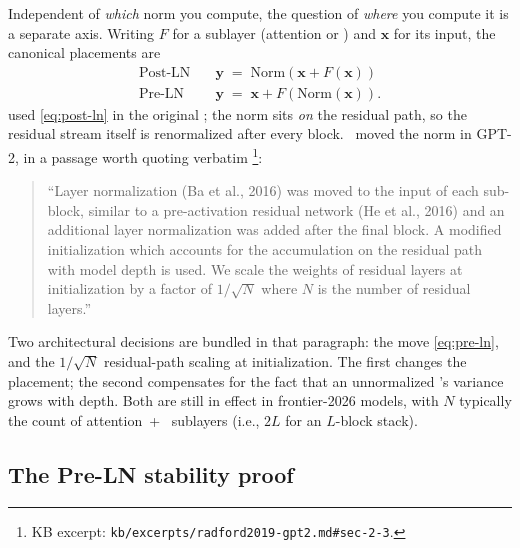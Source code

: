 Independent of \emph{which} norm you compute, the question of
\emph{where} you compute it is a separate axis. Writing $F$ for a
sublayer (attention or ) and $\mathbf{x}$ for its input, the
canonical placements are
\begin{align}
  \text{Post-LN} \quad & \mathbf{y} \;=\; \mathrm{Norm}(\mathbf{x} + F(\mathbf{x}))
  \label{eq:post-ln} \\
  \text{Pre-LN} \quad & \mathbf{y} \;=\; \mathbf{x} + F(\mathrm{Norm}(\mathbf{x})).
  \label{eq:pre-ln}
\end{align}
\citet{vaswani2017} used  \eqref{eq:post-ln} in the original
; the norm sits \emph{on} the residual path, so the residual
stream itself is renormalized after every block.~\citet{radford2019-gpt2}
moved the norm in GPT-2, in a passage worth quoting
verbatim%
\footnote{KB excerpt: \nolinkurl{kb/excerpts/radford2019-gpt2.md#sec-2-3}.}:
\begin{quote}
``Layer normalization (Ba et al., 2016) was moved to the input of each
sub-block, similar to a pre-activation residual network (He et al.,
2016) and an additional layer normalization was added after the final
 block. A modified initialization which accounts for the
accumulation on the residual path with model depth is used. We scale
the weights of residual layers at initialization by a factor of
$1/\sqrt{N}$ where $N$ is the number of residual layers.''
\citep[\S 2.3]{radford2019-gpt2}
\end{quote}
Two architectural decisions are bundled in that paragraph: the 
move \eqref{eq:pre-ln}, and the $1/\sqrt{N}$ residual-path scaling at
initialization. The first changes the placement; the second compensates
for the fact that an unnormalized 's variance grows with
depth. Both are still in effect in frontier-2026 models, with $N$
typically the count of attention~+~ sublayers (i.e., $2L$ for an
$L$-block  stack).

\subsection{The Pre-LN stability proof}
\label{sec:norm-stability}

